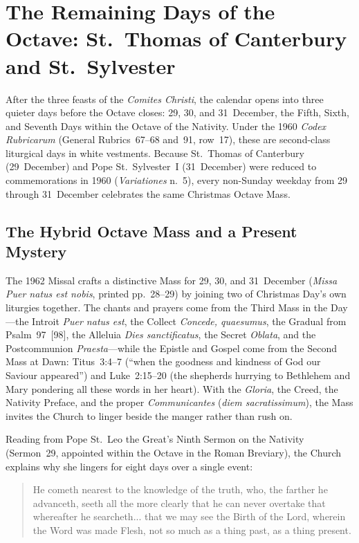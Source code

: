 \section{The Remaining Days of the Octave: St.~Thomas of Canterbury and St.~Sylvester}\label{sec:octave-days}

After the three feasts of the \textit{Comites Christi}, the calendar opens into
three quieter days before the Octave closes: 29, 30, and 31~December, the
Fifth, Sixth, and Seventh Days within the Octave of the Nativity. Under the
1960 \textit{Codex Rubricarum} (General Rubrics~67--68 and~91, row~17), these
are second-class liturgical days in white vestments. Because St.~Thomas of
Canterbury (29~December) and Pope St.~Sylvester~I (31~December) were reduced to
commemorations in 1960 (\textit{Variationes} n.~5), every non-Sunday weekday
from 29 through 31~December celebrates the same Christmas Octave Mass.

\subsection{The Hybrid Octave Mass and a Present Mystery}

The 1962 Missal crafts a distinctive Mass for 29, 30, and 31~December
(\textit{Missa Puer natus est nobis}, printed pp.~28--29) by joining two of
Christmas Day's own liturgies together. The chants and prayers come from the
Third Mass in the Day---the Introit \textit{Puer natus est}, the Collect
\textit{Concede, quaesumus}, the Gradual from Psalm~97~[98], the Alleluia
\textit{Dies sanctificatus}, the Secret \textit{Oblata}, and the Postcommunion
\textit{Praesta}---while the Epistle and Gospel come from the Second Mass at
Dawn: Titus~3:4--7 (``when the goodness and kindness of God our Saviour
appeared'') and Luke~2:15--20 (the shepherds hurrying to Bethlehem and Mary
pondering all these words in her heart). With the \textit{Gloria}, the Creed,
the Nativity Preface, and the proper \textit{Communicantes} (\textit{diem
sacratissimum}), the Mass invites the Church to linger beside the manger rather
than rush on.

Reading from Pope St.~Leo the Great's Ninth Sermon on the Nativity (Sermon~29,
appointed within the Octave in the Roman Breviary), the Church explains why she
lingers for eight days over a single event:

\begin{quote}
He cometh nearest to the knowledge of the truth, who, the farther he advanceth,
seeth all the more clearly that he can never overtake that whereafter he
searcheth... that we may see the Birth of the Lord, wherein the Word was made
Flesh, not so much as a thing past, as a thing present.
\end{quote}

